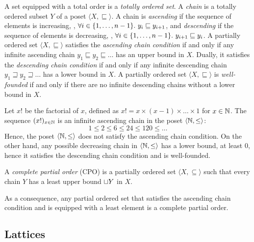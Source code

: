 A set equipped with a total order is a \emph{totally ordered set}. A \emph{chain} is a totally ordered subset $Y$ of a poset $\langle X, \sqsubseteq \rangle$. A chain is \emph{ascending} if the sequence of elements is increasing, \ie, $\forall i \in \{1, \ldots, n-1\}.~ y_i \sqsubseteq y_{i+1}$, and \emph{descending} if the sequence of elements is decreasing, \ie, $\forall i \in \{1, \ldots, n-1\}.~ y_{i+1} \sqsubseteq y_i$. A partially ordered set $\langle X, \sqsubseteq \rangle$ satisfies the \emph{ascending chain condition} if  and only if any infinite ascending chain $y_1 \sqsubseteq y_2 \sqsubseteq \ldots$ has an upper bound in $X$. Dually, it satisfies the \emph{descending chain condition} if and only if any infinite descending chain $y_1 \sqsupseteq y_2 \sqsupseteq \ldots$ has a lower bound in $X$.
A partially ordered set $\langle X, \sqsubseteq \rangle$ is \emph{well-founded} if and only if there are no infinite descending chains without a lower bound in $X$.

\begin{example}
  Let $x!$ be the factorial of $x$, defined as $x! = x \times (x-1) \times \ldots \times 1$ for $x\in\mathbb{N}$.
  The sequence $(x!)_{x\in\mathbb{N}}$ is an infinite ascending chain in the poset $\langle \mathbb{N}, \le \rangle$:
  \[ 1 \le 2 \le 6 \le 24 \le 120 \le \ldots \]
  Hence, the poset $\langle \mathbb{N}, \le \rangle$ does not satisfy the ascending chain condition.
  On the other hand, any possible decreasing chain in $\langle \mathbb{N}, \le \rangle$ has a lower bound, at least $0$, hence it satisfies the descending chain condition and is well-founded.
\end{example}

\begin{definition}
  A \emph{complete partial order} (CPO) is a partially ordered set $\langle X, \subseteq \rangle$ such that every chain $Y$ has a least upper bound $\sqcup Y$ in $X$.
\end{definition}

As a consequence, any partial ordered set that satisfies the ascending chain condition and is equipped with a least element is a complete partial order.

\subsection{Lattices}

